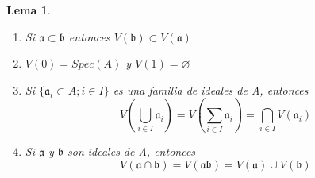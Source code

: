 \documentclass{article}
\newtheorem{lemma}{Lema}
\begin{document}
\begin{lemma}
    \begin{enumerate}
        \item Si $\mathfrak{a} \subset \mathfrak{b}$ entonces $V(\mathfrak{b}) \subset V(\mathfrak{a})$
        \item $V(0)=Spec(A)$ y $V(1)=\varnothing$
        \item Si $\{\mathfrak{a}_{i} \subset A ; i\in I\}$ es una familia de ideales de A,
        entonces $$V(\bigcup_{i\in I} \mathfrak{a}_i) = V(\sum_{i\in I}\mathfrak{a}_i) = 
        \bigcap_{i\in I} V(\mathfrak{a}_i)$$
        \item Si $\mathfrak{a}$ y $\mathfrak{b}$ son ideales de A, entonces
        $$V(\mathfrak{a}\cap \mathfrak{b}) = V(\mathfrak{a} \mathfrak{b}) = V(\mathfrak{a})\cup V(\mathfrak{b}) $$
    \end{enumerate}
\end{lemma}
\end{document}
